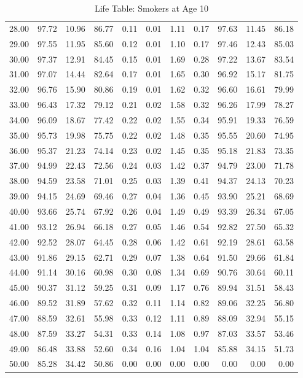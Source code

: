 \begin{table}[ht]
\begin{tabular}{rrrrrrrrrrr}
  28.00 & 97.72 & 10.96 & 86.77 & 0.11 & 0.01 & 1.11 & 0.17 & 97.63 & 11.45 & 86.18 \\ 
  29.00 & 97.55 & 11.95 & 85.60 & 0.12 & 0.01 & 1.10 & 0.17 & 97.46 & 12.43 & 85.03 \\ 
  30.00 & 97.37 & 12.91 & 84.45 & 0.15 & 0.01 & 1.69 & 0.28 & 97.22 & 13.67 & 83.54 \\ 
  31.00 & 97.07 & 14.44 & 82.64 & 0.17 & 0.01 & 1.65 & 0.30 & 96.92 & 15.17 & 81.75 \\ 
  32.00 & 96.76 & 15.90 & 80.86 & 0.19 & 0.01 & 1.62 & 0.32 & 96.60 & 16.61 & 79.99 \\ 
  33.00 & 96.43 & 17.32 & 79.12 & 0.21 & 0.02 & 1.58 & 0.32 & 96.26 & 17.99 & 78.27 \\ 
  34.00 & 96.09 & 18.67 & 77.42 & 0.22 & 0.02 & 1.55 & 0.34 & 95.91 & 19.33 & 76.59 \\ 
  35.00 & 95.73 & 19.98 & 75.75 & 0.22 & 0.02 & 1.48 & 0.35 & 95.55 & 20.60 & 74.95 \\ 
  36.00 & 95.37 & 21.23 & 74.14 & 0.23 & 0.02 & 1.45 & 0.35 & 95.18 & 21.83 & 73.35 \\ 
  37.00 & 94.99 & 22.43 & 72.56 & 0.24 & 0.03 & 1.42 & 0.37 & 94.79 & 23.00 & 71.78 \\ 
  38.00 & 94.59 & 23.58 & 71.01 & 0.25 & 0.03 & 1.39 & 0.41 & 94.37 & 24.13 & 70.23 \\ 
  39.00 & 94.15 & 24.69 & 69.46 & 0.27 & 0.04 & 1.36 & 0.45 & 93.90 & 25.21 & 68.69 \\ 
  40.00 & 93.66 & 25.74 & 67.92 & 0.26 & 0.04 & 1.49 & 0.49 & 93.39 & 26.34 & 67.05 \\ 
  41.00 & 93.12 & 26.94 & 66.18 & 0.27 & 0.05 & 1.46 & 0.54 & 92.82 & 27.50 & 65.32 \\ 
  42.00 & 92.52 & 28.07 & 64.45 & 0.28 & 0.06 & 1.42 & 0.61 & 92.19 & 28.61 & 63.58 \\ 
  43.00 & 91.86 & 29.15 & 62.71 & 0.29 & 0.07 & 1.38 & 0.64 & 91.50 & 29.66 & 61.84 \\ 
  44.00 & 91.14 & 30.16 & 60.98 & 0.30 & 0.08 & 1.34 & 0.69 & 90.76 & 30.64 & 60.11 \\ 
  45.00 & 90.37 & 31.12 & 59.25 & 0.31 & 0.09 & 1.17 & 0.76 & 89.94 & 31.51 & 58.43 \\ 
  46.00 & 89.52 & 31.89 & 57.62 & 0.32 & 0.11 & 1.14 & 0.82 & 89.06 & 32.25 & 56.80 \\ 
  47.00 & 88.59 & 32.61 & 55.98 & 0.33 & 0.12 & 1.11 & 0.89 & 88.09 & 32.94 & 55.15 \\ 
  48.00 & 87.59 & 33.27 & 54.31 & 0.33 & 0.14 & 1.08 & 0.97 & 87.03 & 33.57 & 53.46 \\ 
  49.00 & 86.48 & 33.88 & 52.60 & 0.34 & 0.16 & 1.04 & 1.04 & 85.88 & 34.15 & 51.73 \\ 
  50.00 & 85.28 & 34.42 & 50.86 & 0.00 & 0.00 & 0.00 & 0.00 & 0.00 & 0.00 & 0.00 \\ 
   \hline
\end{tabular}
\caption{Life Table: Smokers at Age 10} 
\end{table}
